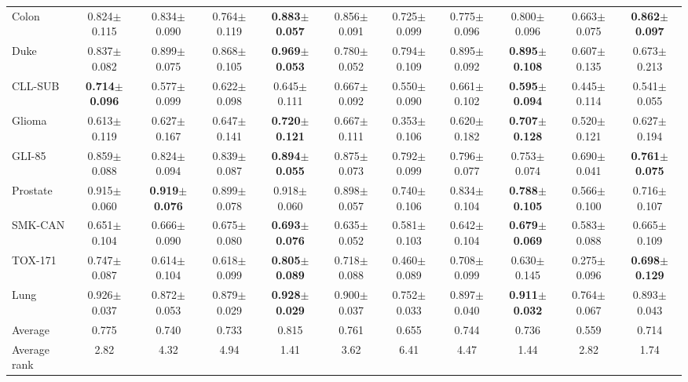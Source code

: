 \begin{table}[!t]
\begin{tabular*}{\textwidth}{@{\extracolsep{\fill}}lcccccccccc@{}}
Colon & 0.824$\pm$0.115 & 0.834$\pm$0.090 & 0.764$\pm$0.119 & \textbf{0.883$\pm$0.057} & 0.856$\pm$0.091 & 0.725$\pm$0.099 & 0.775$\pm$0.096 & 0.800$\pm$0.096 & 0.663$\pm$0.075 & \textbf{0.862$\pm$0.097} \\
Duke & 0.837$\pm$0.082 & 0.899$\pm$0.075 & 0.868$\pm$0.105 & \textbf{0.969$\pm$0.053} & 0.780$\pm$0.052 & 0.794$\pm$0.109 & 0.895$\pm$0.092 & \textbf{0.895$\pm$0.108} & 0.607$\pm$0.135 & 0.673$\pm$0.213 \\
CLL-SUB & \textbf{0.714$\pm$0.096} & 0.577$\pm$0.099 & 0.622$\pm$0.098 & 0.645$\pm$0.111 & 0.667$\pm$0.092 & 0.550$\pm$0.090 & 0.661$\pm$0.102 & \textbf{0.595$\pm$0.094} & 0.445$\pm$0.114 & 0.541$\pm$0.055 \\
Glioma & 0.613$\pm$0.119 & 0.627$\pm$0.167 & 0.647$\pm$0.141 & \textbf{0.720$\pm$0.121} & 0.667$\pm$0.111 & 0.353$\pm$0.106 & 0.620$\pm$0.182 & \textbf{0.707$\pm$0.128} & 0.520$\pm$0.121 & 0.627$\pm$0.194 \\
GLI-85 & 0.859$\pm$0.088 & 0.824$\pm$0.094 & 0.839$\pm$0.087 & \textbf{0.894$\pm$0.055} & 0.875$\pm$0.073 & 0.792$\pm$0.099 & 0.796$\pm$0.077 & 0.753$\pm$0.074 & 0.690$\pm$0.041 & \textbf{0.761$\pm$0.075} \\
Prostate & 0.915$\pm$0.060 & \textbf{0.919$\pm$0.076} & 0.899$\pm$0.078 & 0.918$\pm$0.060 & 0.898$\pm$0.057 & 0.740$\pm$0.106 & 0.834$\pm$0.104 & \textbf{0.788$\pm$0.105} & 0.566$\pm$0.100 & 0.716$\pm$0.107 \\
SMK-CAN & 0.651$\pm$0.104 & 0.666$\pm$0.090 & 0.675$\pm$0.080 & \textbf{0.693$\pm$0.076} & 0.635$\pm$0.052 & 0.581$\pm$0.103 & 0.642$\pm$0.104 & \textbf{0.679$\pm$0.069} & 0.583$\pm$0.088 & 0.665$\pm$0.109 \\
TOX-171 & 0.747$\pm$0.087 & 0.614$\pm$0.104 & 0.618$\pm$0.099 & \textbf{0.805$\pm$0.089} & 0.718$\pm$0.088 & 0.460$\pm$0.089 & 0.708$\pm$0.099 & 0.630$\pm$0.145 & 0.275$\pm$0.096 & \textbf{0.698$\pm$0.129} \\
Lung & 0.926$\pm$0.037 & 0.872$\pm$0.053 & 0.879$\pm$0.029 & \textbf{0.928$\pm$0.029} & 0.900$\pm$0.037 & 0.752$\pm$0.033 & 0.897$\pm$0.040 & \textbf{0.911$\pm$0.032} & 0.764$\pm$0.067 & 0.893$\pm$0.043 \\
\midrule
Average & 0.775 & 0.740 & 0.733 & 0.815 & 0.761 & 0.655 & 0.744 & 0.736 & 0.559 & 0.714 \\
Average rank & 2.82 & 4.32 & 4.94 & 1.41 & 3.62 & 6.41 & 4.47 & 1.44 & 2.82 & 1.74 \\
\bottomrule
\end{tabular*}
\end{table}
